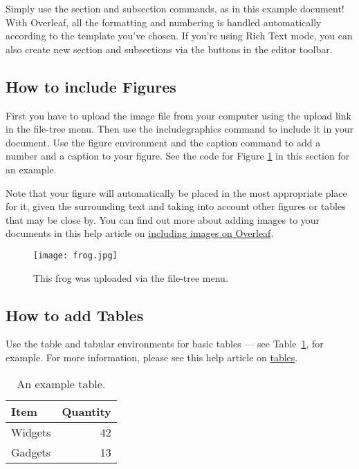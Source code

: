 \documentclass{article}
\begin{document}
Simply use the section and subsection commands, as in this example document! With Overleaf, all the formatting and numbering is handled automatically according to the template you've chosen. If you're using Rich Text mode, you can also create new section and subsections via the buttons in the editor toolbar.

\subsection{How to include Figures}

First you have to upload the image file from your computer using the upload link in the file-tree menu. Then use the includegraphics command to include it in your document. Use the figure environment and the caption command to add a number and a caption to your figure. See the code for Figure \ref{fig:frog} in this section for an example.

Note that your figure will automatically be placed in the most appropriate place for it, given the surrounding text and taking into account other figures or tables that may be close by. You can find out more about adding images to your documents in this help article on \href{https://www.overleaf.com/learn/how-to/Including_images_on_Overleaf}{including images on Overleaf}.

\begin{figure}
\centering
\texttt{[image: frog.jpg]}
\caption{\label{fig:frog}This frog was uploaded via the file-tree menu.}
\end{figure}

\subsection{How to add Tables}

Use the table and tabular environments for basic tables --- see Table~\ref{tab:widgets}, for example. For more information, please see this help article on \href{https://www.overleaf.com/learn/latex/tables}{tables}. 

\begin{table}
\centering
\begin{tabular}{l|r}
Item & Quantity \\\hline
Widgets & 42 \\
Gadgets & 13
\end{tabular}
\caption{\label{tab:widgets}An example table.}
\end{table}
\end{document}
